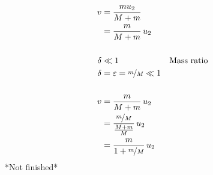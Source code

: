 \documentclass[12pt]{article}
\begin{document}
\begin{align*}
	v      & = \frac{m u_2}{M + m}                                                   \\
	       & = \frac{m}{M + m} \, u_2                                                \\
	\phantom{=}                                                                      \\
	\delta & \ll 1                                            &  & \text{Mass ratio} \\
	\delta & = \varepsilon = \nicefrac{m}{M} \ll 1                                   \\
	\phantom{=}                                                                      \\
	v      & = \frac{m}{M + m} \, u_2                                                \\
	       & = \frac{\nicefrac{m}{M}}{\frac{M + m}{M}} \, u_2                        \\
	       & = \frac{m}{1 + \nicefrac{m}{M}} \, u_2                                  \\
\end{align*}
*Not finished*
\end{document}
